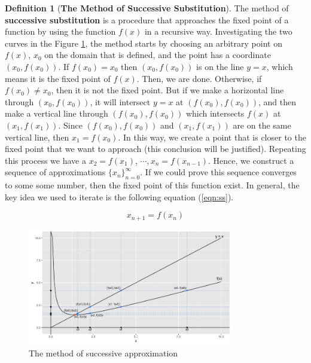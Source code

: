 \documentclass{article}
\theoremstyle{definition}
\newtheorem{definition}{Definition}[section]
\theoremstyle{remark}
\begin{document}
\begin{definition}[\textbf{The Method of Successive Substitution}]\label{def:MethodSS}
The method of \textbf{successive substitution} is a procedure that approaches the fixed point of a function by using the function $f(x)$ in a recursive way. Investigating the two curves in the Figure \ref{vis:V1}, the method starts by choosing an arbitrary point on $f(x)$, $x_{0}$ on the domain that is defined, and the point has a coordinate $(x_0, f(x_0))$. If $f(x_0) = x_0$ then $(x_0, f(x_0))$ is on the line $y = x$, which means it is the fixed point of $f(x)$. Then, we are done. Otherwise, if $f(x_0) \neq x_0$, then it is not the fixed point. But if we make a horizontal line through $(x_0,f(x_0))$, it will intersect $y = x$ at $(f(x_0),f(x_0))$, and then make a vertical line through $(f(x_0),f(x_0))$ which intersects $f(x)$ at $(x_1,f(x_1))$. Since $(f(x_0),f(x_0))$ and $(x_1,f(x_1))$ are on the same vertical line, then $x_1 = f(x_0)$. In this way, we create a point that is closer to the fixed point that we want to approach (this conclusion will be justified). Repeating this process we have a $x_2 = f(x_1)$, $\cdots, x_n = f(x_{n-1})$. Hence, we construct a sequence of approximations $\{x_n\}_{n=0}^{\infty}$. If we could prove this sequence converges to some some number, then the fixed point of this function exist. In general, the key idea we used to iterate is the following equation (\ref{eqn:ss}).

\begin{equation} \label{eqn:ss}
    x_{n+1} = f(x_{n})
\end{equation}

\end{definition}

\begin{figure}[H]
\centering
\includegraphics[width=0.8\textwidth]{Successive Approximation Visualization.png}
\caption{\label{vis:V1}The method of successive approximation}
\end{figure}
\end{document}
